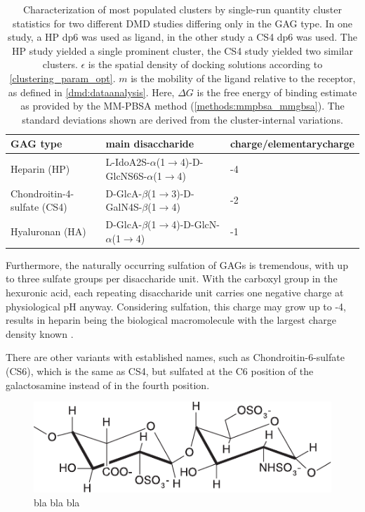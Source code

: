 \begin{table}
\scriptsize
\centering
\renewcommand{\arraystretch}{1.3}
\begin{tabular}{lll}
\midrule
GAG type & main disaccharide & charge/\si{elementarycharge} \\
\midrule
Heparin (HP) & L-IdoA2S-$\alpha$(1$\rightarrow$4)-D-GlcNS6S-$\alpha$(1$\rightarrow$4) & -4 \\
Chondroitin-4-sulfate (CS4) & D-GlcA-$\beta$(1$\rightarrow$3)-D-GalN4S-$\beta$(1$\rightarrow$4) & -2 \\
Hyaluronan (HA) & D-GlcA-$\beta$(1$\rightarrow$4)-D-GlcN-$\alpha$(1$\rightarrow$4) & -1 \\
\midrule
\end{tabular}
\caption{
Characterization of most populated clusters by single-run quantity cluster
statistics for two different DMD studies differing only in the GAG type. In one
study, a HP dp6 was used as ligand, in the other study a CS4 dp6 was used. The
HP study yielded a single prominent cluster, the CS4 study yielded two similar
clusters. $\epsilon$ is the spatial density of docking solutions according to
\cref{clustering_param_opt}. $m$ is the mobility of the ligand relative to the
receptor, as defined in \cref{dmd:dataanalysis}. Here, $\Delta G$ is the free
energy of binding estimate as provided by the MM-PBSA method
(\cref{methods:mmpbsa_mmgbsa}). The standard deviations shown are derived from
the cluster-internal variations.}
\label{tab:bg:gagtypes}
\end{table}



Furthermore, the naturally occurring sulfation of GAGs is tremendous, with up to
three sulfate groups per disaccharide unit. With the carboxyl group in the
hexuronic acid, each repeating disaccharide unit carries one negative charge at
physiological pH anyway. Considering sulfation, this charge may grow up to -4,
results in heparin being the biological macromolecule with the largest charge
density known \cite{capila_linhardt_hep_prot_2002}.


There are other variants with established names, such as Chondroitin-6-sulfate (CS6), which is the same as CS4, but sulfated at the C6 position of the galactosamine instead of in the fourth position.




\begin{figure}
\centering
\includegraphics[width=1.0\textwidth]{gfx/background/hp_repeating_unit_structure_01.pdf}
\caption[]{
bla bla bla
}
\label{fig:bg:heparin_chemstruct}
\end{figure}




